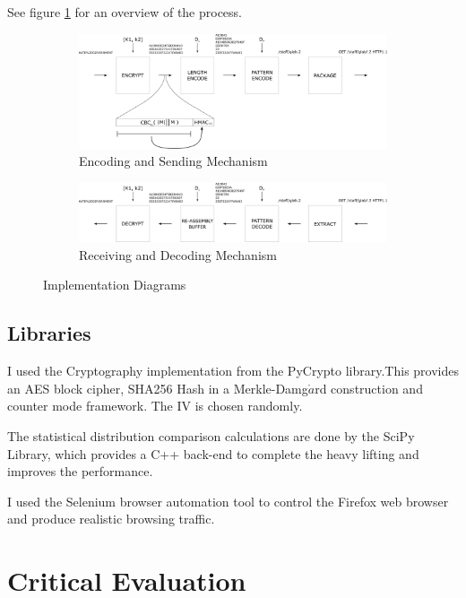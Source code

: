 \documentclass[ %
                    author={Samuel Russell},
                supervisor={Prof. Bogdan Warinschi},
                    degree={MEng},
                     title={Innocuous Ciphertexts},
                  subtitle={The DE-CENSOR Scheme},
                      type={research},
                      year={2018} ]{dissertation}
\begin{document}
See figure \ref{fig:imp-diag} for an overview of the process.

\begin{figure}[b]
\begin{subfigure}{\textwidth}
\includegraphics[scale=0.9]{diagram-enc}
\caption{Encoding and Sending Mechanism}
\end{subfigure}

\begin{subfigure}{\textwidth}
\includegraphics[scale=0.9]{diagram-dec}
\caption{Receiving and Decoding Mechanism}
\end{subfigure}
\caption{Implementation Diagrams}
\label{fig:imp-diag}
\end{figure}

\section{Libraries}

I used the Cryptography implementation from the PyCrypto library.This provides an AES block cipher, SHA256 Hash in a Merkle-Damg$\mathring{a}$rd construction and counter mode framework. The IV is chosen randomly.

The statistical distribution comparison calculations are done by the SciPy Library, which provides a C++ back-end to complete the heavy lifting and improves the performance.

I used the Selenium browser automation tool to control the Firefox web browser and produce realistic browsing traffic.


\chapter{Critical Evaluation}
\label{chap:evaluation}
\end{document}
